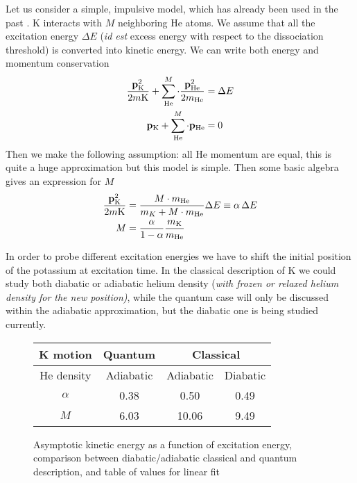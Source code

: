 Let us consider a simple, impulsive  model, which has already been used in the past \cite{Her2012}. 
K interacts with $M$ neighboring He atoms. We assume that all the excitation energy $\Delta E$ (\textit{id est} excess energy with respect to the dissociation threshold) is converted into kinetic energy. 
We can write both energy and momentum conservation
\begin{align}
\frac{\vb{p}_{\mathrm{K}}^2}{2m\mathrm{K}}+\sum_{\mathrm{He}}^M \cdot\frac{\vb{p}^2_{\mathrm{He}}}{2m_{\mathrm{He}}} &= \Delta E\\
\vb{p}_{\mathrm{K}} + \sum_{\mathrm{He}}^M \cdot \vb{p}_{\mathrm{He}} &= 0 
\end{align}
Then we make the following assumption: all He momentum are equal, this is quite a huge approximation but this model is simple. Then some basic algebra gives an expression for $M$
\begin{align}
\frac{\vb{p}_{\mathrm{K}}^2}{2m\mathrm{K}} &= \frac{M\cdot m_{\mathrm{He}}}{m_K+M\cdot m_{\mathrm{He}}} \Delta E \equiv \alpha \, \Delta E\\
M &= \frac{\alpha}{1-\alpha} \frac{m_{\mathrm{K}}}{m_{\mathrm{He}}}
\end{align}

In order to probe different excitation energies we have to shift the initial position of the potassium at excitation time. 
In the classical description  of K we could study both diabatic or adiabatic helium density (\textit{with frozen or relaxed helium density for the new position)}, while the quantum case will only be discussed within the adiabatic approximation, but the diabatic one is being studied currently. 
\begin{figure}[h!]
\centering
\begin{minipage}[c]{0.48\linewidth}
\centering
		
\end{minipage}
\hfill
\begin{minipage}[c]{0.48\linewidth}
\centering
\begin{tabular}{|c|c|c|c|}
\hline
K motion & Quantum	& \multicolumn{2}{c|}{Classical} \\
\hline
He density & Adiabatic	& Adiabatic & Diabatic \\
  \hline
	$\alpha$ & 0.38 & 0.50 & 0.49 \\
	\hline
	$M$ & 6.03 & 10.06 & 9.49 \\
  \hline
\end{tabular}
\end{minipage}
\vspace{0.5\baselineskip}
		\caption{Asymptotic kinetic energy as a function of excitation energy, comparison between diabatic/adiabatic classical and quantum description, and table of values for linear fit\label{fig:5S-mass}}
\end{figure}

